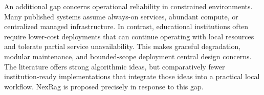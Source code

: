 An additional gap concerns operational reliability in constrained environments. Many published systems assume always-on services, abundant compute, or centralized managed infrastructure. In contrast, educational institutions often require lower-cost deployments that can continue operating with local resources and tolerate partial service unavailability. This makes graceful degradation, modular maintenance, and bounded-scope deployment central design concerns. The literature offers strong algorithmic ideas, but comparatively fewer institution-ready implementations that integrate those ideas into a practical local workflow. NexRag is proposed precisely in response to this gap.
